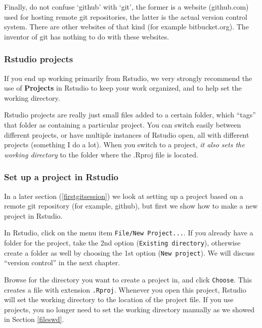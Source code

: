 \documentclass[]{book}
\begin{document}
Finally, do not confuse `github' with `git', the former is a website (github.com) used for hosting remote git repositories, the latter is the actual version control system. There are other websites of that kind (for example bitbucket.org). The inventor of git has nothing to do with these websites.

\hypertarget{rstudio-projects-1}{%
\subsubsection{Rstudio projects}\label{rstudio-projects-1}}

If you end up working primarily from Rstudio, we very strongly recommend the use of \textbf{Projects} in Rstudio to keep your work organized, and to help set the working directory.

Rstudio projects are really just small files added to a certain folder, which ``tags'' that folder as containing a particular project. You can switch easily between different projects, or have multiple instances of Rstudio open, all with different projects (something I do a lot). When you switch to a project, \emph{it also sets the working directory} to the folder where the .Rproj file is located.

\hypertarget{set-up-a-project-in-rstudio}{%
\subsubsection{Set up a project in Rstudio}\label{set-up-a-project-in-rstudio}}

In a later section (\ref{firstgitsession}) we look at setting up a project based on a remote git repository (for example, github), but first we show how to make a new project in Rstudio.

In Rstudio, click on the menu item \texttt{File/New\ Project...}. If you already have a folder for the project, take the 2nd option (\texttt{Existing\ directory}), otherwise create a folder as well by choosing the 1st option (\texttt{New\ project}). We will discuss ``version control'' in the next chapter.

Browse for the directory you want to create a project in, and click \texttt{Choose}. This creates a file with extension \texttt{.Rproj}. Whenever you open this project, Rstudio will set the working directory to the location of the project file. If you use projects, you no longer need to set the working directory manually as we showed in Section \ref{fileswd}.
\end{document}
